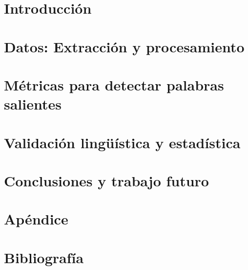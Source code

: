 \documentclass[11pt,a4paper]{tesis}
\begin{document}
\def\titulo{Licenciatura\xspace}

\def\autor{Damián Eliel Aleman}
\def\tituloTesis{Titulo de Tesis}
\def\runtitulo{\tituloTesis}
\def\director{Juan Manuel Pérez y Santiago Kalinowski}
\def\codirector{Agustín Gravano}
\def\lugar{Buenos Aires, 2017}
%



\frontmatter
\pagestyle{empty}




\tableofcontents

\mainmatter
\pagestyle{headings}


\chapter{Introducción}
\label{ch:introduccion}


\chapter{Datos: Extracción y procesamiento}
\label{ch:datos}


\chapter{Métricas para detectar palabras salientes}
\label{ch:metricas}


\chapter{Validación lingüística y estadística}
\label{ch:validacion}


\chapter{Conclusiones y trabajo futuro}
\label{ch:conclusiones}


\chapter{Apéndice}
\label{ch:apendice}



\chapter{Bibliografía}
\backmatter



\end{document}
